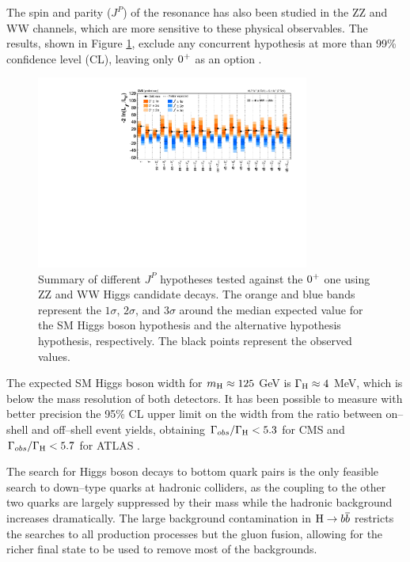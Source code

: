 The spin and parity ($J^P$) of the resonance has also been studied in the ZZ and WW channels, which are more sensitive to these physical observables. The results, shown in Figure \ref{fig:hjp}, exclude any concurrent hypothesis at more than 99\% confidence level (CL), leaving only $0^{+}$ as an option \cite{CMS:2014gga}.

\begin{figure}
        \centering
	\includegraphics[width=0.8\textwidth]{1_Introduction_Th_and_Exp/pics/hwwhzz_JP_SummaryPlot.pdf}
       \caption{Summary of different $J^P$ hypotheses tested against the $0^{+}$ one using ZZ and WW Higgs candidate decays. The orange and blue bands represent the $1\sigma$, $2\sigma$, and $3\sigma$ around the median expected value for the SM Higgs boson hypothesis and the alternative hypothesis hypothesis, respectively. The black points represent the observed values. }
       \label{fig:hjp}
\end{figure}

The expected SM Higgs boson width for $m_{\mathrm{H}} \approx 125$ GeV is $\Gamma_{\mathrm{H}} \approx 4$ MeV, which is below the mass resolution of both detectors. It has been possible to measure with better precision the 95\% CL upper limit on the width from the ratio between on--shell and off--shell event yields, obtaining $\Gamma_{obs} / \Gamma_{\mathrm{H}} < 5.3$ for CMS \cite{Khachatryan:2014iha} and $\Gamma_{obs} / \Gamma_{\mathrm{H}} < 5.7$ for ATLAS \cite{ATLASCONF:2014042}. 

The search for Higgs boson decays to bottom quark pairs is the only feasible search to down--type quarks at hadronic colliders, as the coupling to the other two quarks are largely suppressed by their mass while the hadronic background increases dramatically. The large background contamination in $\mathrm{H}\rightarrow b\overline{b}$ restricts the searches to all production processes but the gluon fusion, allowing for the richer final state to be used to remove most of the backgrounds.

